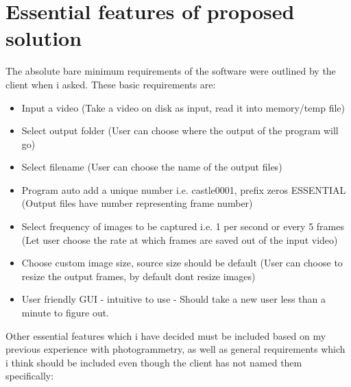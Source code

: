 \documentclass[11pt]{report}
\begin{document}
\section{Essential features of proposed solution} \label{feat}
The absolute bare minimum requirements of the software were outlined by the client when i asked. These basic requirements are:
\begin{itemize}
\item Input a video (Take a video on disk as input, read it into memory/temp file)
\item Select output folder (User can choose where the output of the program will go)
\item Select filename (User can choose the name of the output files)
\item Program auto add a unique number i.e. castle0001, prefix zeros ESSENTIAL (Output files have number representing frame number)
\item Select frequency of images to be captured i.e. 1 per second or every 5 frames (Let user choose the rate at which frames are saved out of the input video)
\item Choose custom image size, source size should be default (User can choose to resize the output frames, by default dont resize images)
\item User friendly GUI - intuitive to use - Should take a new user less than a minute to figure out.
\end{itemize}
Other essential features which i have decided must be included based on my previous experience with photogrammetry, as well as general requirements which i think should be included even though the client has not named them specifically:
\end{document}
